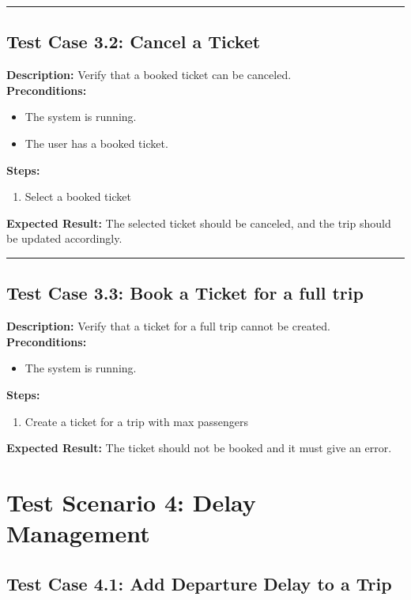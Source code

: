 \documentclass{article}
\begin{document}
\bigskip
\hrule
\bigskip

\subsection{Test Case 3.2: Cancel a Ticket}

\textbf{Description:} Verify that a booked ticket can be canceled.\\
\textbf{Preconditions:}
\begin{itemize}
  \item The system is running.
  \item The user has a booked ticket.
\end{itemize}
\textbf{Steps:}
\begin{enumerate}
  \item Select a booked ticket
\end{enumerate}
\textbf{Expected Result:} The selected ticket should be canceled, and the trip should be updated accordingly.

\bigskip
\hrule
\bigskip

\subsection{Test Case 3.3: Book a Ticket for a full trip}

\textbf{Description:} Verify that a ticket for a full trip cannot be created.\\
\textbf{Preconditions:}
\begin{itemize}
  \item The system is running.
\end{itemize}
\textbf{Steps:}
\begin{enumerate}
  \item Create a ticket for a trip with max passengers
\end{enumerate}
\textbf{Expected Result:} The ticket should not be booked and it must give an error.

\pagebreak

\section{Test Scenario 4: Delay Management}
\bigskip
\bigskip
\subsection{Test Case 4.1: Add Departure Delay to a Trip}
\end{document}
